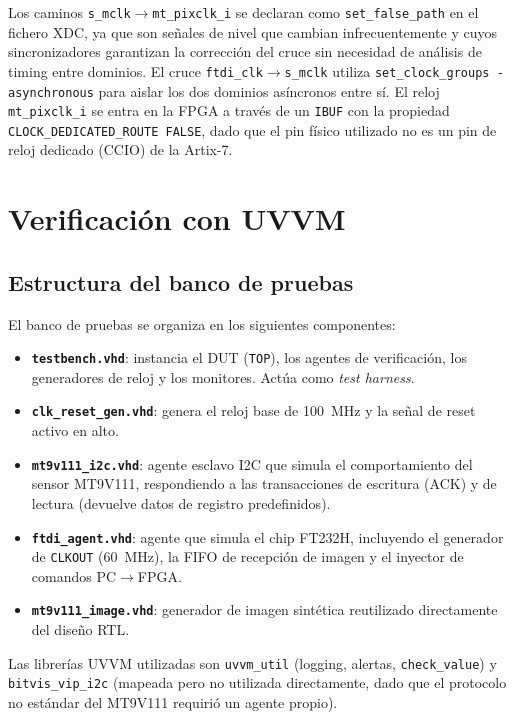 \documentclass[../main.tex]{subfiles}
\begin{document}
Los caminos \texttt{s\_mclk}$\rightarrow$\texttt{mt\_pixclk\_i} se declaran como \texttt{set\_false\_path} en el fichero XDC, ya que son señales de nivel que cambian infrecuentemente y cuyos sincronizadores garantizan la corrección del cruce sin necesidad de análisis de timing entre dominios. El cruce \texttt{ftdi\_clk}$\rightarrow$\texttt{s\_mclk} utiliza \texttt{set\_clock\_groups -asynchronous} para aislar los dos dominios asíncronos entre sí. El reloj \texttt{mt\_pixclk\_i} se entra en la FPGA a través de un \texttt{IBUF} con la propiedad \texttt{CLOCK\_DEDICATED\_ROUTE FALSE}, dado que el pin físico utilizado no es un pin de reloj dedicado (CCIO) de la Artix-7.

\section{Verificación con UVVM}
\label{sec:verificacion}

\subsection{Estructura del banco de pruebas}

El banco de pruebas se organiza en los siguientes componentes:

\begin{itemize}
    \item \textbf{\texttt{testbench.vhd}}: instancia el DUT (\texttt{TOP}), los agentes de verificación, los generadores de reloj y los monitores. Actúa como \textit{test harness}.
    \item \textbf{\texttt{clk\_reset\_gen.vhd}}: genera el reloj base de 100~MHz y la señal de reset activo en alto.
    \item \textbf{\texttt{mt9v111\_i2c.vhd}}: agente esclavo I2C que simula el comportamiento del sensor MT9V111, respondiendo a las transacciones de escritura (ACK) y de lectura (devuelve datos de registro predefinidos).
    \item \textbf{\texttt{ftdi\_agent.vhd}}: agente que simula el chip FT232H, incluyendo el generador de \texttt{CLKOUT} (60~MHz), la FIFO de recepción de imagen y el inyector de comandos PC$\rightarrow$FPGA.
    \item \textbf{\texttt{mt9v111\_image.vhd}}: generador de imagen sintética reutilizado directamente del diseño RTL.
\end{itemize}

Las librerías UVVM utilizadas son \texttt{uvvm\_util} (logging, alertas, \texttt{check\_value}) y \texttt{bitvis\_vip\_i2c} (mapeada pero no utilizada directamente, dado que el protocolo no estándar del MT9V111 requirió un agente propio).
\end{document}
